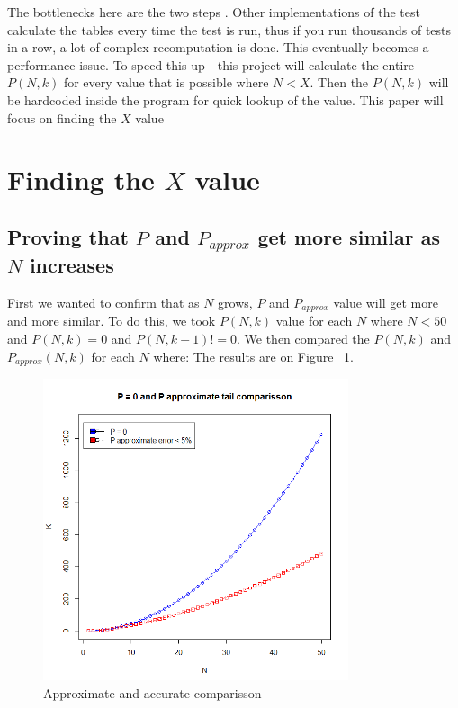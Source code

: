 \documentclass[12pt]{article}
\begin{document}
The bottlenecks here are the two steps . Other implementations of the test calculate the tables every time the test is run, thus if you run thousands of tests in a row, a lot of complex recomputation is done. This eventually becomes a performance issue.
To speed this up - this project will calculate the entire $P(N, k)$ for every value that is possible where $N < X$. Then the $P(N, k)$ will be hardcoded inside the program for quick lookup of the value.
This paper will focus on finding the $X$ value

\newpage

\section{Finding the $X$ value}
\subsection{Proving that $P$ and $P_{approx}$ get more similar as $N$ increases}
First we wanted to confirm that as $N$ grows, $P$ and $P_{approx}$ value will get more and more similar. To do this, we took $P(N, k)$ value for each $N$ where
$N < 50$ and $P(N, k)  = 0$ and $P(N, k - 1) != 0$.
We then compared the $P(N, k)$ and $P_{approx} (N, k)$ for each $N$ where:
The results are on Figure ~\ref{fig:T0vsN}.


\begin{figure}[!h]
	\centering
  \includegraphics[width=0.8\textwidth]{T0vsN}
	\caption{Approximate and accurate comparisson}
	\label{fig:T0vsN}
\end{figure}
\end{document}
